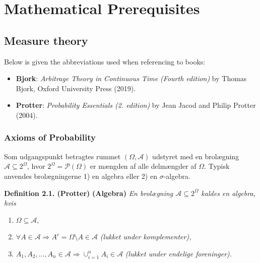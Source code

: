\documentclass[a4paper,12pt,openany]{book}
\providecommand{\tightlist}{%
 \setlength{\itemsep}{0pt}\setlength{\parskip}{0pt}}
\begin{document}
\hypertarget{part-mathematical-prerequisites}{%
\part{Mathematical Prerequisites}\label{part-mathematical-prerequisites}}

\hypertarget{appendix-appendix}{%
\appendix}


\hypertarget{measure-theory}{%
\chapter{Measure theory}\label{measure-theory}}

Below is given the abbreviations used when referencing to books:

\begin{itemize}
\tightlist
\item
  \textbf{Bjork}: \emph{Arbitrage Theory in Continuous Time (Fourth edition)} by Thomas Bjork, Oxford University Press (2019).\cite{bjork2009}
\item
  \textbf{Protter}: \emph{Probability Essentials (2. edition)} by Jean Jacod and Philip Protter (2004).\cite{jacod2004}
\end{itemize}

\hypertarget{axioms-of-probability}{%
\section{Axioms of Probability}\label{axioms-of-probability}}

Som udgangspunkt betragtes rummet \((\Omega,\mathcal{A})\) udstyret med en brolægning \(\mathcal{A}\subseteq 2^\Omega\), hvor \(2^\Omega=\mathcal{P}(\Omega)\) er mængden af alle delmængder af \(\Omega\). Typisk anvendes brolægningerne 1) en algebra eller 2) en \(\sigma\)-algebra.

\textbf{Definition 2.1. (Protter)} \textbf{(Algebra)} \emph{En brolægning \(\mathcal{A}\subseteq 2^\Omega\) kaldes en algebra, hvis}

\begin{enumerate}
\def\labelenumi{\arabic{enumi}.}
\tightlist
\item
  \(\Omega\subseteq\mathcal{A}\),
\item
  \(\forall A\in\mathcal{A} \Rightarrow A^c=\Omega\setminus A\in\mathcal{A}\) \emph{(lukket under komplementer),}
\item
  \(A_1,A_2,...,A_n\in\mathcal{A}\Rightarrow \cup_{i=1}^n A_i\in\mathcal{A}\) \emph{(lukket under endelige foreninger).}
\end{enumerate}
\end{document}

